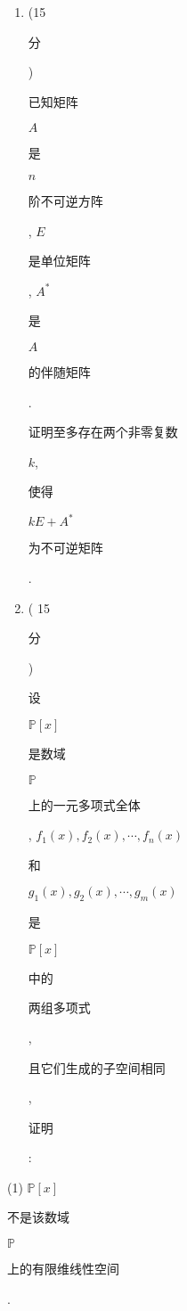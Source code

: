 \documentclass[10pt]{article}
\begin{document}
\begin{enumerate}
  \item (15\begin{CJK}{UTF8}{mj}分\end{CJK}) \begin{CJK}{UTF8}{mj}已知矩阵\end{CJK} $A$ \begin{CJK}{UTF8}{mj}是\end{CJK} $n$ \begin{CJK}{UTF8}{mj}阶不可逆方阵\end{CJK}, $E$ \begin{CJK}{UTF8}{mj}是单位矩阵\end{CJK}, $A^{*}$ \begin{CJK}{UTF8}{mj}是\end{CJK} $A$ \begin{CJK}{UTF8}{mj}的伴随矩阵\end{CJK}. \begin{CJK}{UTF8}{mj}证明至多存在两个非零复数\end{CJK} $k$, \begin{CJK}{UTF8}{mj}使得\end{CJK} $k E+A^{*}$ \begin{CJK}{UTF8}{mj}为不可逆矩阵\end{CJK}.

  \item ( 15\begin{CJK}{UTF8}{mj}分\end{CJK}) \begin{CJK}{UTF8}{mj}设\end{CJK} $\mathbb{P}[x]$ \begin{CJK}{UTF8}{mj}是数域\end{CJK} $\mathbb{P}$ \begin{CJK}{UTF8}{mj}上的一元多项式全体\end{CJK}, $f_{1}(x), f_{2}(x), \cdots, f_{n}(x)$ \begin{CJK}{UTF8}{mj}和\end{CJK} $g_{1}(x), g_{2}(x), \cdots, g_{m}(x)$ \begin{CJK}{UTF8}{mj}是\end{CJK} $\mathbb{P}[x]$ \begin{CJK}{UTF8}{mj}中的\end{CJK} \begin{CJK}{UTF8}{mj}两组多项式\end{CJK}, \begin{CJK}{UTF8}{mj}且它们生成的子空间相同\end{CJK}, \begin{CJK}{UTF8}{mj}证明\end{CJK}:

\end{enumerate}
(1) $\mathbb{P}[x]$ \begin{CJK}{UTF8}{mj}不是该数域\end{CJK} $\mathbb{P}$ \begin{CJK}{UTF8}{mj}上的有限维线性空间\end{CJK}.
\end{document}
